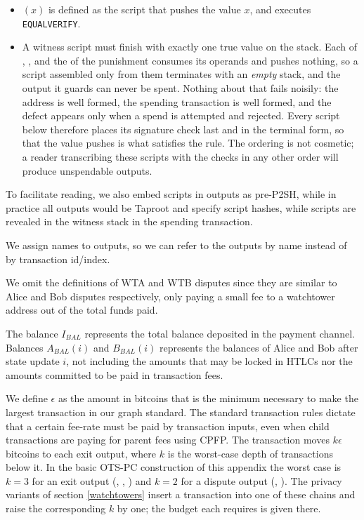 \begin{itemize}
\item {}$(x)$ is defined as the script that pushes the value $x$, and executes \texttt{EQUALVERIFY}.

\item A witness script must finish with exactly one true value on the stack. Each of , ,  and the   of the punishment consumes its operands and pushes nothing, so a script assembled only from them terminates with an \emph{empty} stack, and the output it guards can never be spent. Nothing about that fails noisily: the address is well formed, the spending transaction is well formed, and the defect appears only when a spend is attempted and rejected. Every script below therefore places its signature check last and in the terminal  form, so that the value  pushes is what satisfies the rule. The ordering is not cosmetic; a reader transcribing these scripts with the checks in any other order will produce unspendable outputs.

\end{itemize}

To facilitate reading, we also embed scripts in outputs as pre-P2SH, while in practice all outputs would be Taproot and specify script hashes, while scripts are revealed in the witness stack in the spending transaction.

We assign names to outputs, so we can refer to the outputs by name instead of by transaction id/index.

We omit the definitions of WTA and WTB disputes since they are similar to Alice and Bob disputes respectively, only paying a small fee to a  watchtower address out of the total funds paid.

The balance $I_{BAL}$ represents the total balance deposited in the payment channel. Balances $A_{BAL}(i)$ and $B_{BAL}(i)$ represents the balances of Alice and Bob after state update $i$, not including the amounts that may be locked in HTLCs nor the amounts committed to be paid in transaction fees.

We define $\epsilon$ as the amount in bitcoins that is the minimum necessary to make the largest transaction in our graph standard. The standard transaction rules dictate that a certain fee-rate must be paid by transaction inputs, even when child transactions are paying for parent fees using CPFP. The  transaction moves $k\epsilon$ bitcoins to each exit output, where $k$ is the worst-case depth of transactions below it. In the basic OTS-PC construction of this appendix the worst case is $k=3$ for an exit output (, , ) and $k=2$ for a dispute output (, ). The privacy variants of section \ref{watchtowers} insert a transaction into one of these chains and raise the corresponding $k$ by one; the budget each requires is given there.

